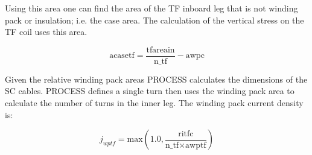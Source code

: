 \documentclass[hidelinks]{article}
\numberwithin{equation}{section}
\begin{document}
    \noi Using this area one can find the area of the TF inboard leg that 
    is not winding pack or insulation; i.e. the case area. The calculation of the 
    vertical stress on the TF coil uses this area.

    \begin{equation}\label{eq: acasetf}
    \text{acasetf} = \frac{\text{tfareain}}{\text{n\_tf}} - \text{awpc}
    \end{equation}

    \noi Given the relative winding pack areas PROCESS calculates the dimensions of 
    the SC cables. PROCESS defines a single turn then uses the winding pack area to 
    calculate the number of turns in the inner leg. The winding pack current density is:

    \begin{equation}
    j_{wptf} = \text{max}(1.0, \frac{\text{ritfc}}{\text{n\_tf} \times \text{awptf}})
    \end{equation}
\end{document}
